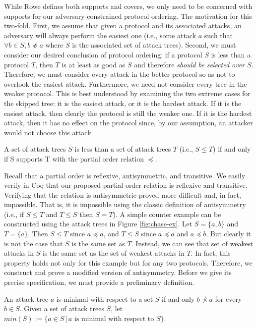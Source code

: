 \documentclass[runningheads]{llncs}
\theoremstyle{definition}
\begin{document}
While Rowe defines both supports and covers, we only need to be concerned with supports for our adversary-constrained protocol ordering. The motivation for this two-fold. First, we assume that given a protocol and its associated attacks, an adversary will always perform the easiest one (i.e., some attack $a$ such that $\forall b \in S, b \npreceq a$ where $S$ is the associated set of attack trees). Second, we must consider our desired conclusion of protocol ordering: if a protocol $S$ is less than a protocol $T$, then $T$ is at least as good as $S$ and therefore \emph{should be selected over $S$}. Therefore, we must consider every attack in the better protocol so as not to overlook the easiest attack. Furthermore, we need not consider every tree in the weaker protocol. This is best understood by examining the two extreme cases for the skipped tree: it is the easiest attack, or it is the hardest attack. If it is the easiest attack, then clearly the protocol is still the weaker one. If it is the hardest attack, then it has no effect on the protocol since, by our assumption, an attacker would not choose this attack.

\begin{definition}
  A set of attack trees $S$ is less than a set of attack trees $T$ (i.e., $S \leq T$) if and only if S supports T with the partial order relation $\preceq$.
\end{definition} 

Recall that a partial order is reflexive, antisymmetric, and transitive. We easily verify in Coq that our proposed partial order relation is reflexive and transitive. Verifying that the relation is antisymmetric proved more difficult and, in fact, impossible. That is, it is impossible using the classic definition of antisymmetry (i.e., if $S \le T$ and $T \le S$ then $S = T$). A simple counter example can be constructed using the attack trees in Figure \ref{fig:chase-ex}. Let $S = \{a,b\}$ and $T = \{a\}$. Then $S \le T$ since $a \preceq a$, and $T \le S$ since $a \preceq a$ and $a \preceq b$. But clearly it is not the case that $S$ is the same set as $T$. Instead, we can see that set of weakest attacks in $S$ is the same set as the set of weakest attacks in $T$. In fact, this property holds not only for this example but for any two protocols. Therefore, we construct and prove a modified version of antisymmetry. Before we give its precise specification, we must provide a preliminary definition.

\begin{definition}
  An attack tree $a$ is minimal with respect to a set $S$ if and only $b \nprec a$ for every $b \in S$. Given a set of attack trees $S$, let $min(S) := \{a \in S \,|\, a \text{ is minimal with respect to } S \}$.
\end{definition}
\end{document}
